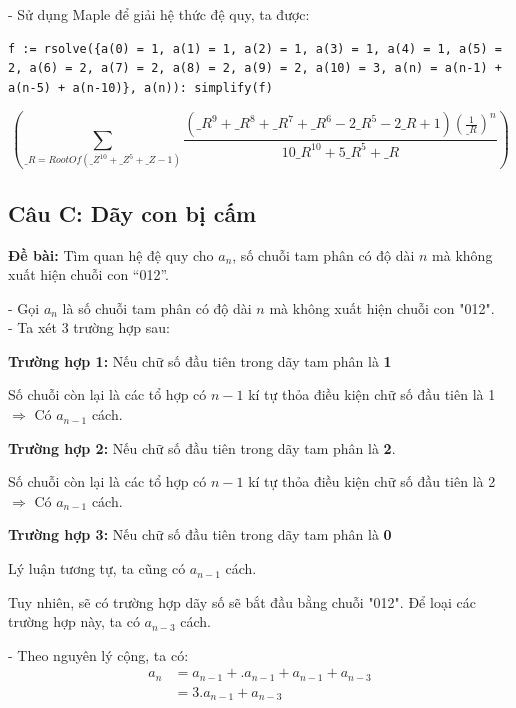\documentclass[12pt]{article}
\newcommand{\SubItem}[1]{
    {\setlength\itemindent{15pt} \item[-] #1}
}
\begin{document}
\begin{sloppypar}
- Sử dụng Maple để giải hệ thức đệ quy, ta được:

\begin{lstlisting}[breaklines]
    f := rsolve({a(0) = 1, a(1) = 1, a(2) = 1, a(3) = 1, a(4) = 1, a(5) = 2, a(6) = 2, a(7) = 2, a(8) = 2, a(9) = 2, a(10) = 3, a(n) = a(n-1) + a(n-5) + a(n-10)}, a(n)): simplify(f)
\end{lstlisting}



\begin{equation*}
    \left(\sum_{\_R = RootOf(\_Z^{10} + \_Z^{5} + \_Z-1)}\frac{(\_R^{9} + \_R^{8} + \_R^{7} + \_R^{6} - 2\_R^{5} - 2\_R + 1)(\frac{1}{\_R})^{n}}{10\_R^{10} + 5\_R^{5} + \_R}\right)
\end{equation*}

\subsection{Câu C: Dãy con bị cấm}
\begin{tcolorbox}
    \textbf{Đề bài:} Tìm quan hệ đệ quy cho \(a_{n}\), số chuỗi tam phân có độ dài \(n\) mà không xuất hiện chuỗi con “012”.
\end{tcolorbox}

- Gọi \(a_{n}\) là số chuỗi tam phân có độ dài \(n\) mà không xuất hiện chuỗi con "012". \\
- Ta xét 3 trường hợp sau:
\begin{itemize}
    \item \textbf{Trường hợp 1:} Nếu chữ số đầu tiên trong dãy tam phân là \textbf{1} 
        \SubItem{Số chuỗi còn lại là các tổ hợp có \(n-1\) kí tự thỏa điều kiện chữ số đầu tiên là 1 \(\Rightarrow\) Có \(a_{n-1}\) cách.}
    \item \textbf{Trường hợp 2:} Nếu chữ số đầu tiên trong dãy tam phân là \textbf{2}.
        \SubItem{Số chuỗi còn lại là các tổ hợp có \(n-1\) kí tự thỏa điều kiện chữ số đầu tiên là 2 \(\Rightarrow\) Có \(a_{n-1}\) cách.}
    \item \textbf{Trường hợp 3:} Nếu chữ số đầu tiên trong dãy tam phân là \textbf{0}
        \SubItem{Lý luận tương tự, ta cũng có \(a_{n-1}\) cách.} 
        \SubItem{Tuy nhiên, sẽ có trường hợp dãy số sẽ bắt đầu bằng chuỗi "012". Để loại các trường hợp này, ta có \(a_{n-3}\) cách. }
\end{itemize}

- Theo nguyên lý cộng, ta có:
\begin{align*}
    a_{n}   & = a_{n-1} + .a_{n-1} + a_{n-1} + a_{n-3} \\
            & = 3.a_{n-1} + a_{n-3}
\end{align*}


\end{sloppypar}
\end{document}

